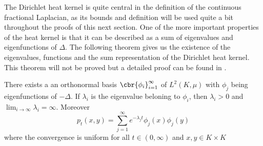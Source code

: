 The Dirichlet heat kernel is quite central in the definition of the continuous fractional Laplacian, as its bounds and definition will be used quite a bit throughout the proofs of this next section. One of the more important properties of the heat kernel is that it can be described as a sum of eigenvalues and eigenfunctions of $\Delta$. The following theorem gives us the existence of the eigenvalues, functions and the sum representation of the Dirichlet heat kernel. This theorem will not be proved but a detailed proof can be found in \cite[Theorem 2.2]{Jozef}.
\begin{theorem}\label{heatKernelWritten}
	There exists a an orthonormal basis $\cbr{\phi_{i}}^{\infty}_{i = 1}$ of $L^2(K, \mu)$ with $\phi_j$ being eigenfunctions of $-\Delta$. If $\lambda_i$ is the eigenvalue beloning to $\phi_i$, then $\lambda_i >0$ and $\lim_{i \to \infty} \lambda_i = \infty$. Moreover
	\begin{equation}
		p_t(x,y) = \sum_{j = 1}^{\infty} e^{-\lambda_j t} \phi_j(x)\phi_j(y)
	\end{equation}
	where the convergence is uniform for all $t \in (0, \infty)$ and $x,y \in K \times K$
\end{theorem}

